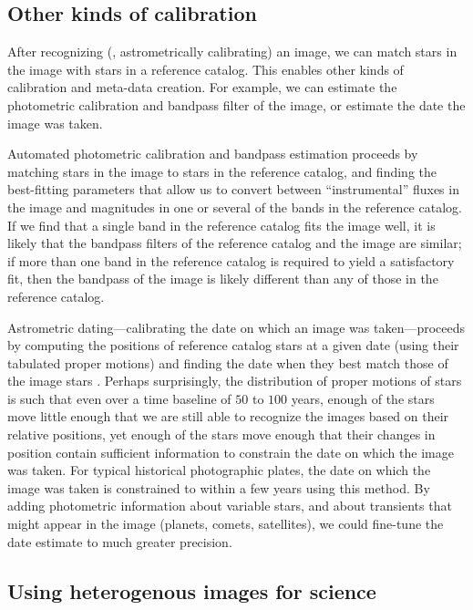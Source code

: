 
\subsection{Other kinds of calibration}


After recognizing (\ie, astrometrically calibrating) an image, we can
match stars in the image with stars in a reference catalog.  This
enables other kinds of calibration and meta-data creation.  For
example, we can estimate the photometric calibration and bandpass
filter of the image, or estimate the date the image was taken.


Automated photometric calibration and bandpass estimation proceeds by
matching stars in the image to stars in the reference catalog, and
finding the best-fitting parameters that allow us to convert between
``instrumental'' fluxes in the image and magnitudes in one or several
of the bands in the reference catalog.  If we find that a single band
in the reference catalog fits the image well, it is likely that the
bandpass filters of the reference catalog and the image are similar;
if more than one band in the reference catalog is required to yield a
satisfactory fit, then the bandpass of the image is likely different
than any of those in the reference catalog.


Astrometric dating---calibrating the date on which an image was
taken---proceeds by computing the positions of reference catalog stars
at a given date (using their tabulated proper motions) and finding the
date when they best match those of the image stars \cite{blinddate}.
Perhaps surprisingly, the distribution of proper motions of stars is
such that even over a time baseline of $50$ to $100$ years, enough of
the stars move little enough that we are still able to recognize the
images based on their relative positions, yet enough of the stars move
enough that their changes in position contain sufficient information
to constrain the date on which the image was taken.  For typical
historical photographic plates, the date on which the image was taken
is constrained to within a few years using this method.  By adding
photometric information about variable stars, and about transients
that might appear in the image (planets, comets, satellites), we could
fine-tune the date estimate to much greater precision.




\subsection{Using heterogenous images for science}


